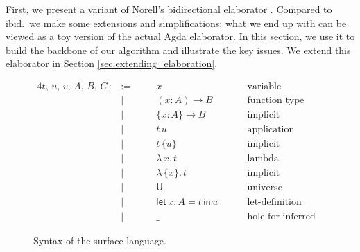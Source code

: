 \documentclass[acmsmall,review,anonymous,prologue,dvipsnames]{acmart}\settopmatter{printfolios=true,printccs=false,printacmref=false}
\newcommand{\slet}{\boldsymbol{\mathsf{let}}}
\renewcommand{\sin}{\boldsymbol{\mathsf{in}}}
\renewcommand{\U}{\mathsf{U}}
\theoremstyle{remark}
\begin{document}
First, we present a variant of Norell's bidirectional elaborator
\cite[Chapter~3]{norell07thesis}. Compared to ibid.\ we make some extensions and
simplifications; what we end up with can be viewed as a toy version of the
actual Agda elaborator. In this section, we use it to build the backbone of our
algorithm and illustrate the key issues. We extend this elaborator in Section
\ref{sec:extending_elaboration}.
\begin{figure}[h]
\begin{alignat*}{4}
  t,\,u,\,v,\,A,\,B,\,C\, :&:=\quad  && x\hspace{8em}              & \text{variable}                 &  \\
                           & |       && (x : A)\to B               & \text{function type}            &  \\
                           & |       && \{x : A\}\to B             & \text{implicit function type}   &  \\
                           & |       && t\,u                       & \text{application}              &  \\
                           & |       && t\,\{u\}                   & \text{implicit application}     &  \\
                           & |       && \lambda\,x.\, t            & \text{lambda abstraction}       &  \\
                           & |       && \lambda\,\{x\}.\,t         & \text{implicit abstraction}     &  \\
                           & |       && \U                         & \text{universe}                 &  \\
                           & |       && \slet\,x : A = t\,\sin\, u & \text{let-definition}           &  \\
                           & |       && \_                         & \text{hole for inferred term}   &
\end{alignat*}
\caption{Syntax of the surface language.}
\label{fig:surface}
\end{figure}
\end{document}
